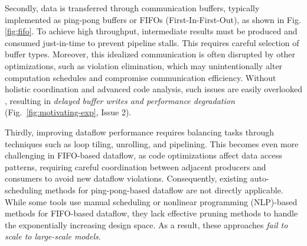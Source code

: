 \documentclass[conference]{IEEEtran}
\begin{document}
Secondly, data is transferred through communication buffers, typically implemented as ping-pong buffers or FIFOs (First-In-First-Out), as shown in Fig. \ref{fig:fifo}.
To achieve high throughput, intermediate results must be produced and consumed just-in-time to prevent pipeline stalls. 
This requires careful selection of buffer types.
Moreover, this idealized communication is often disrupted by other optimizations, such as violation elimination, which may unintentionally alter computation schedules and compromise communication efficiency. Without holistic coordination and advanced code analysis, such issues are easily overlooked \cite{streamhlsFPGA25}, resulting in \textit{delayed buffer writes and performance degradation} (Fig.~\ref{fig:motivating-exp}, Issue 2).


Thirdly, improving dataflow performance requires balancing tasks through techniques such as loop tiling, unrolling, and pipelining. This becomes even more challenging in FIFO-based dataflow, as code optimizations affect data access patterns, requiring careful coordination between adjacent
producers and consumers to avoid new dataflow violations. Consequently, existing auto-scheduling methods for ping-pong-based dataflow \cite{ye2024hida} are not directly applicable. While some tools use manual scheduling \cite{lai2019heterocl, xiang2022heteroflow} or nonlinear programming (NLP)-based methods \cite{streamhlsFPGA25, unifiedFPGA2025} for FIFO-based dataflow, they lack effective pruning methods to handle the exponentially increasing design space. As a result, these approaches \textit{fail to scale to large-scale models}.


\end{document}
